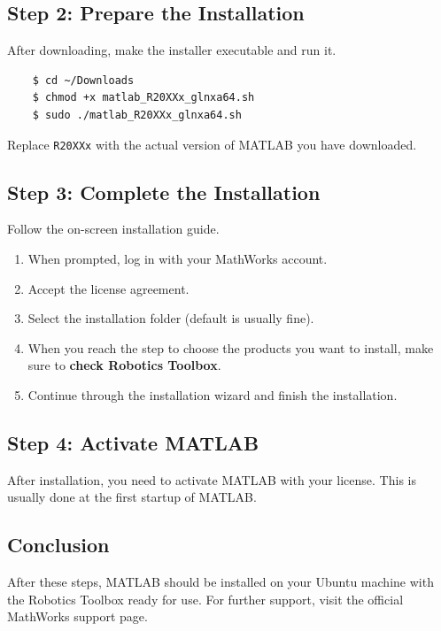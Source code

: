\documentclass[12pt,a4paper]{article}
\begin{document}
	\subsection{Step 2: Prepare the Installation}
	After downloading, make the installer executable and run it.
	\begin{verbatim}
	$ cd ~/Downloads
	$ chmod +x matlab_R20XXx_glnxa64.sh
	$ sudo ./matlab_R20XXx_glnxa64.sh
	\end{verbatim}
	Replace \texttt{R20XXx} with the actual version of MATLAB you have downloaded.
	
	\subsection{Step 3: Complete the Installation}
	Follow the on-screen installation guide.
	\begin{enumerate}
		\item When prompted, log in with your MathWorks account.
		\item Accept the license agreement.
		\item Select the installation folder (default is usually fine).
		\item When you reach the step to choose the products you want to install, make sure to \textbf{check Robotics Toolbox}.
		\item Continue through the installation wizard and finish the installation.
	\end{enumerate}
	
	\subsection{Step 4: Activate MATLAB}
	After installation, you need to activate MATLAB with your license. This is usually done at the first startup of MATLAB.
	
	\subsection{Conclusion}
	After these steps, MATLAB should be installed on your Ubuntu machine with the Robotics Toolbox ready for use. For further support, visit the official MathWorks support page.
	
	
\end{document}
